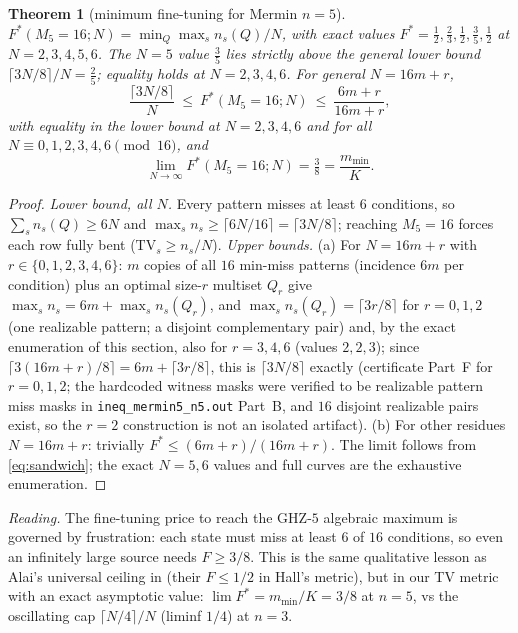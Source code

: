 \documentclass[aps,pra,reprint,superscriptaddress,floatfix]{revtex4-2}
\newcommand{\TV}{\mathrm{TV}}
\newtheorem{theorem}{Theorem}
\begin{document}
\begin{theorem}[minimum fine-tuning for {Mermin} $n=5$]
\label{thm:mermin5}
$F^{*}(M_{5}=16;N)=\min_{Q}\max_{s}n_{s}(Q)/N$, with exact values
$F^{*}=\tfrac12,\tfrac23,\tfrac12,\tfrac35,\tfrac12$ at $N=2,3,4,5,6$.
The $N=5$ value $\tfrac35$ lies \emph{strictly above} the general lower
bound $\lceil 3N/8\rceil/N=\tfrac25$; equality holds at $N=2,3,4,6$. For
general $N=16m+r$,
\begin{equation}
\frac{\lceil 3N/8\rceil}{N}\ \le\ F^{*}(M_{5}=16;N)\ \le\
\frac{6m+r}{16m+r},
\label{eq:sandwich}
\end{equation}
with equality in the lower bound at $N=2,3,4,6$ and for all
$N\equiv 0,1,2,3,4,6\pmod{16}$, and
\begin{equation}
\lim_{N\to\infty}F^{*}(M_{5}=16;N)=\tfrac38=\frac{m_{\min}}{K}.
\label{eq:lim38}
\end{equation}
\end{theorem}

\begin{proof}
\emph{Lower bound, all $N$.} Every pattern misses at least $6$
conditions, so $\sum_{s}n_{s}(Q)\ge 6N$ and $\max_{s}n_{s}\ge\lceil
6N/16\rceil=\lceil 3N/8\rceil$; reaching $M_{5}=16$ forces each row fully
bent ($\TV_{s}\ge n_{s}/N$). \emph{Upper bounds.} (a) For
$N=16m+r$ with $r\in\{0,1,2,3,4,6\}$: $m$ copies of all $16$ min-miss
patterns (incidence $6m$ per condition) plus an optimal size-$r$ multiset
$Q_{r}$ give $\max_{s}n_{s}=6m+\max_{s}n_{s}(Q_{r})$, and
$\max_{s}n_{s}(Q_{r})=\lceil 3r/8\rceil$ for $r=0,1,2$ (one realizable
pattern; a disjoint complementary pair) and, by the exact enumeration of
this section, also for $r=3,4,6$ (values $2,2,3$); since
$\lceil 3(16m+r)/8\rceil=6m+\lceil 3r/8\rceil$, this is
$\lceil 3N/8\rceil$ exactly (certificate Part~F for $r=0,1,2$; the
hardcoded witness masks were verified to be realizable pattern miss masks
in \texttt{ineq\_mermin5\_n5.out} Part~B, and $16$ disjoint realizable
pairs exist, so the $r=2$ construction is not an isolated artifact).
(b) For other residues $N=16m+r$: trivially $F^{*}\le (6m+r)/(16m+r)$.
The limit follows from \eqref{eq:sandwich}; the exact $N=5,6$ values and
full curves are the exhaustive enumeration.
\end{proof}

\emph{Reading.} The fine-tuning price to reach the GHZ-$5$ algebraic
maximum is governed by frustration: each state must miss at least $6$ of
$16$ conditions, so even an infinitely large source needs $F\ge 3/8$.
This is the same qualitative lesson as Alai's universal ceiling in
\cite{alai2026b} (their $F\le 1/2$ in Hall's metric), but in our TV metric
with an exact asymptotic value: $\lim F^{*}=m_{\min}/K=3/8$ at $n=5$, vs
the oscillating cap $\lceil N/4\rceil/N$ (liminf $1/4$) at $n=3$.
\end{document}

